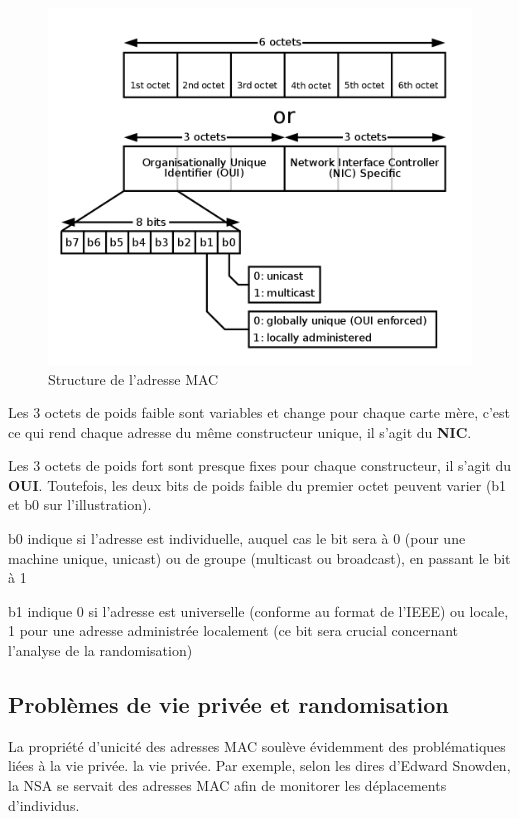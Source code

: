 \begin{figure}[H]
	\centering
	\includegraphics[width=12cm]{images/probe/mac_struc.png}
	\caption{Structure de l'adresse MAC}
	\label{fig:macstruct}
\end{figure}

Les 3 octets de poids faible sont variables et change pour chaque carte mère, c'est ce qui rend chaque adresse du même
constructeur unique, il s'agit du \textbf{NIC}.

Les 3 octets de poids fort sont presque fixes pour chaque constructeur, il s'agit du \textbf{OUI}.
Toutefois, les deux bits de poids faible du premier octet peuvent varier (b1 et b0 sur l'illustration).

b0 indique si l'adresse est individuelle, auquel cas le bit sera à 0 (pour une machine unique, unicast) 
ou de groupe (multicast ou broadcast), en passant le bit à 1

b1 indique 0 si l'adresse est universelle (conforme au format de l'IEEE) ou 
locale, 1 pour une adresse administrée localement (ce bit sera crucial concernant l'analyse de la randomisation)

\subsection{Problèmes de vie privée et randomisation}
La propriété d'unicité des adresses MAC soulève évidemment des problématiques liées à la vie privée. 
la vie privée. Par exemple, selon les dires d'Edward Snowden, la NSA se servait des adresses MAC afin de
monitorer les déplacements d'individus.~\cite{hackernews:snowdan}

